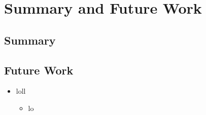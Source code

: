 \chapter{Summary and Future Work}\label{ch:summary_and_discussion}

\section{Summary}

\section{Future Work}

\begin{itemize}
	\item loll
	\begin{itemize}
		\item lo
	\end{itemize}
\end{itemize}



